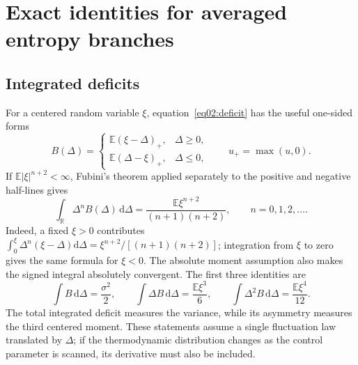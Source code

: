 \documentclass[11pt,letterpaper]{article}
\newcommand{\E}{\mathbb{E}}
\newcommand{\dd}{\mathrm{d}}
\theoremstyle{plain}
\theoremstyle{definition}
\theoremstyle{remark}
\begin{document}
\section{Exact identities for averaged entropy branches}
\label{app08:identities}

\subsection{Integrated deficits}

For a centered random variable $\xi$, equation~\eqref{eq02:deficit} has the useful one-sided forms
\begin{equation}
 B(\Delta)=
 \begin{cases}
 \E(\xi-\Delta)_+,&\Delta\geq0,\\
 \E(\Delta-\xi)_+,&\Delta\leq0,
 \end{cases}
 \qquad u_+=\max(u,0).
 \label{eq08:one_sided}
\end{equation}
If $\E|\xi|^{n+2}<\infty$, Fubini's theorem applied separately to the positive and negative half-lines gives
\begin{equation}
 \int_{\mathbb R}\Delta^nB(\Delta)\,\dd\Delta
 =\frac{\E\xi^{n+2}}{(n+1)(n+2)},
 \qquad n=0,1,2,\ldots.
 \label{eq08:moment_identity}
\end{equation}
Indeed, a fixed $\xi>0$ contributes
$\int_0^\xi \Delta^n(\xi-\Delta)\dd\Delta
=\xi^{n+2}/[(n+1)(n+2)]$; integration from $\xi$ to zero gives the same formula for $\xi<0$. The absolute moment assumption also makes the signed integral absolutely convergent. The first three identities are
\begin{equation}
 \int B\,\dd\Delta=\frac{\sigma^2}{2},\qquad
 \int\Delta B\,\dd\Delta=\frac{\E\xi^3}{6},\qquad
 \int\Delta^2B\,\dd\Delta=\frac{\E\xi^4}{12}.
 \label{eq08:first_moments}
\end{equation}
The total integrated deficit measures the variance, while its asymmetry measures the third centered moment. These statements assume a single fluctuation law translated by $\Delta$; if the thermodynamic distribution changes as the control parameter is scanned, its derivative must also be included.
\end{document}
